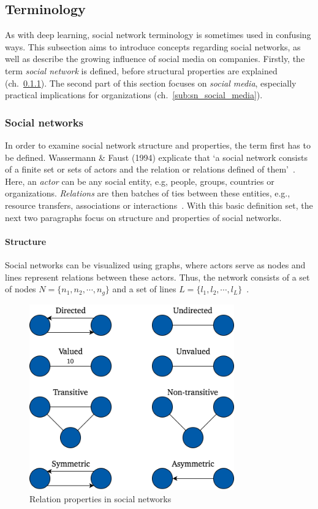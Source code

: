 \subsection{Terminology}
\label{sub:sn_terminology}

As with deep learning, social network terminology is sometimes used in confusing
ways.
This subsection aims to introduce concepts regarding social networks, as well
as describe the growing influence of social media on companies.
Firstly, the term \textit{social network} is defined, before structural
properties are explained (ch.~\ref{sub:sn_social_networks}).
The second part of this section focuses on \textit{social media}, especially
practical implications for organizations (ch.~\ref{sub:sn_social_media}).

\subsubsection{Social networks}
\label{sub:sn_social_networks}

In order to examine social network structure and properties, the term first
has to be defined.
Wassermann \& Faust (1994) explicate that `a social network consists of a finite
set or sets of actors and the relation or relations defined of them'~\cite[p. 20]{Wasserman1994}.
Here, an \textit{actor} can be any social entity, e.g, people, groups, countries or
organizations.
\textit{Relations} are then batches of ties between these entities, e.g., resource
transfers, associations or interactions~\cite{Wasserman1994}.
With this basic definition set, the next two paragraphs focus on structure and
properties of social networks.

\paragraph{Structure}

Social networks can be visualized using graphs, where actors serve as nodes
and lines represent relations between these actors.
Thus, the network consists of a set of nodes $N = \{n_1, n_2, \cdots, n_g\}$ and
a set of lines $L = \{l_1, l_2, \cdots, l_L\}$~\cite{Wasserman1994}.

\begin{figure}[h]
  \centering
  \includegraphics[height=8cm]{img/relation_properties}
  \caption{Relation properties in social networks}
\label{fig:tie_properties}
\end{figure}

